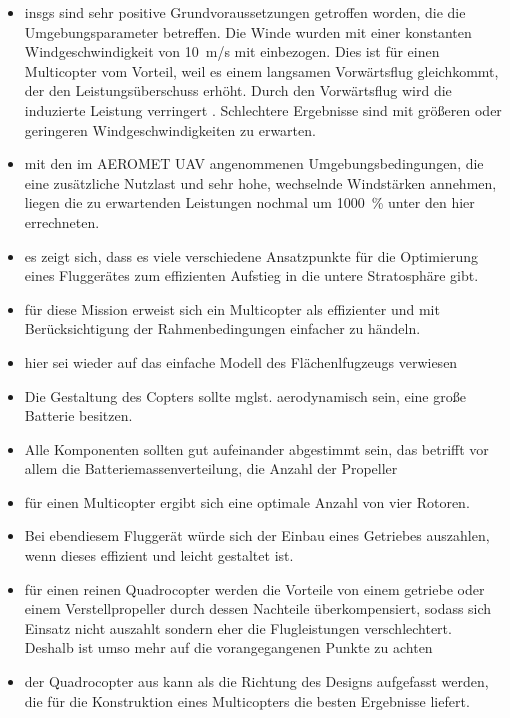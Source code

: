 \begin{itemize}
	\item insgs sind sehr positive Grundvoraussetzungen getroffen worden, die die Umgebungsparameter betreffen. Die Winde wurden mit einer konstanten Windgeschwindigkeit von \SI{10}{m/s} mit einbezogen. Dies ist für einen Multicopter vom Vorteil, weil es einem langsamen Vorwärtsflug gleichkommt, der den Leistungsüberschuss erhöht. Durch den Vorwärtsflug wird die induzierte Leistung verringert \cite[S.329]{Wall.2015}. Schlechtere Ergebnisse sind mit größeren oder geringeren Windgeschwindigkeiten zu erwarten.
	\item mit den im AEROMET UAV angenommenen Umgebungsbedingungen, die eine zusätzliche Nutzlast und sehr hohe, wechselnde Windstärken annehmen, liegen die zu erwartenden Leistungen nochmal um \SI{1000}{\%} unter den hier errechneten. 
	
	\item es zeigt sich, dass es viele verschiedene Ansatzpunkte für die Optimierung eines Fluggerätes zum effizienten Aufstieg in die untere Stratosphäre gibt. 
	\item für diese Mission erweist sich ein Multicopter als effizienter und mit Berücksichtigung der Rahmenbedingungen einfacher zu händeln. 
	\item hier sei wieder auf das einfache Modell des Flächenlfugzeugs verwiesen
	\item Die Gestaltung des Copters sollte mglst. aerodynamisch sein, eine große Batterie besitzen.
	\item Alle Komponenten sollten gut aufeinander abgestimmt sein, das betrifft vor allem die Batteriemassenverteilung, die Anzahl der Propeller
	\item für einen Multicopter ergibt sich eine optimale Anzahl von vier Rotoren.
	\item Bei ebendiesem Fluggerät würde sich der Einbau eines Getriebes auszahlen, wenn dieses effizient und leicht gestaltet ist.
	\item für einen reinen Quadrocopter werden die Vorteile von einem getriebe oder einem Verstellpropeller durch dessen Nachteile überkompensiert, sodass sich Einsatz nicht auszahlt sondern eher die Flugleistungen verschlechtert. Deshalb ist umso mehr auf die vorangegangenen Punkte zu achten
	\item der Quadrocopter aus \cite{Anderson.2018} kann als die Richtung des Designs aufgefasst werden, die für die Konstruktion eines Multicopters die besten Ergebnisse liefert.
\end{itemize}


